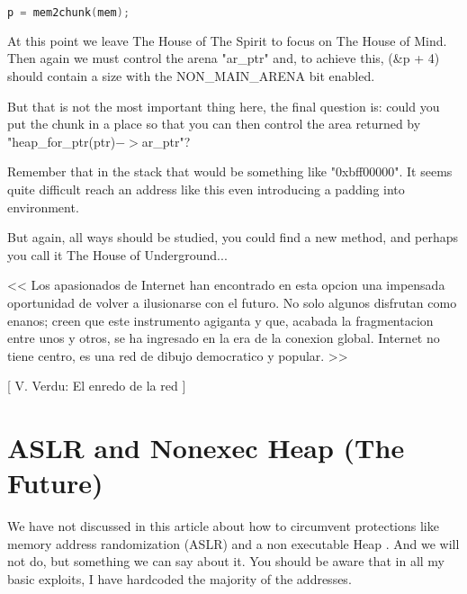 \documentclass[12pt]{article}
\begin{document}
\begin{lstlisting}[language=C]
   p = mem2chunk(mem);
\end{lstlisting}   
	
At this point we leave The House of The Spirit to focus on The House of
Mind. Then again we must control the arena "ar\_ptr" and, to achieve this,
(\&p + 4) should contain a size with the NON\_MAIN\_ARENA bit enabled.
\newline


But that is not the most important thing here, the final question is:
could you put the chunk in a place so that you can then control the area
returned by "heap\_for\_ptr(ptr)$->$ar\_ptr"?
\newline


Remember that in the stack that would be something like "0xbff00000". It
seems quite difficult reach an address like this even introducing a
padding into environment.
\newline


But again, all ways should be studied, you could find a new method, and
perhaps you call it The House of Underground...


\begin{verbnobox}[\small]
                 << Los apasionados de Internet han encontrado
                    en esta opcion una impensada oportunidad
                    de volver a ilusionarse con el futuro. No
                    solo algunos disfrutan como enanos; creen
                    que este instrumento agiganta y que, acabada
                    la fragmentacion entre unos y otros, se ha
                    ingresado en la era de la conexion global.
                    Internet no tiene centro, es una red de
                    dibujo democratico y popular. >>

                               [ V. Verdu: El enredo de la red ]

\end{verbnobox}

\section{ASLR and Nonexec Heap (The Future)}

We have not discussed in this article about how to circumvent protections
like memory address randomization (ASLR) and a non executable Heap . And
we will not do, but something we can say about it. You should be aware
that in all my basic exploits, I have hardcoded the majority of the
addresses.
\newline
\end{document}
